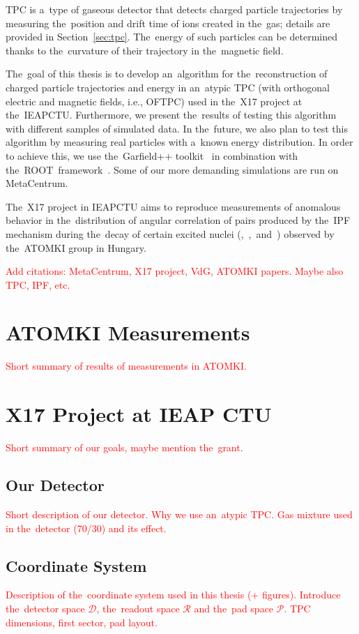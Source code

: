 	\ac{TPC} is a~type of gaseous detector that detects charged particle trajectories by measuring the~position and drift time of ions created in the~gas; details are provided in Section~\ref{sec:tpc}. The~energy of such particles can be determined thanks to the~curvature of their trajectory in the~magnetic field.
	
	The~goal of this thesis is to develop an~algorithm for the~reconstruction of charged particle trajectories and energy in an~atypic \ac{TPC} (with orthogonal electric and magnetic fields, i.e., \ac{OFTPC}) used in the~X17 project at the~\ac{IEAPCTU}. Furthermore, we present the~results of testing this algorithm with different samples of simulated data. In the~future, we also plan to test this algorithm by measuring real particles with a~known energy distribution. In order to achieve this, we use the~Garfield++ toolkit~\cite{Garfield++} in combination with the~ROOT~framework~\cite{ROOT}. Some of our more demanding simulations are run on MetaCentrum.
	
	The~X17 project in \ac{IEAPCTU} aims to reproduce measurements of anomalous behavior in the~distribution of angular correlation of pairs produced by the~\ac{IPF} mechanism during the~decay of certain excited nuclei (,~,~and~) observed by the~ATOMKI group in Hungary. 
	
	\textcolor{red}{Add citations: MetaCentrum, X17 project, VdG, ATOMKI papers. Maybe also TPC, IPF, etc.}
	
	\section{ATOMKI Measurements}
	\textcolor{red}{Short summary of results of measurements in ATOMKI.}
	
	\section{X17 Project at IEAP CTU}
	\label{sec:IEAP}
		\textcolor{red}{Short summary of our goals, maybe mention the~grant.}
	
		\subsection{Our Detector}
		\textcolor{red}{Short description of our detector. Why we use an~atypic TPC. Gas mixture used in the~detector (70/30) and its effect.}
		
		\subsection{Coordinate System}
			\label{sec:coor}
			\textcolor{red}{Description of the~coordinate system used in this thesis (+ figures). Introduce the~detector space $\mathcal{D}$, the~readout space $\mathcal{R}$ and the~pad space $\mathcal{P}$. TPC dimensions, first sector, pad layout.}
		
